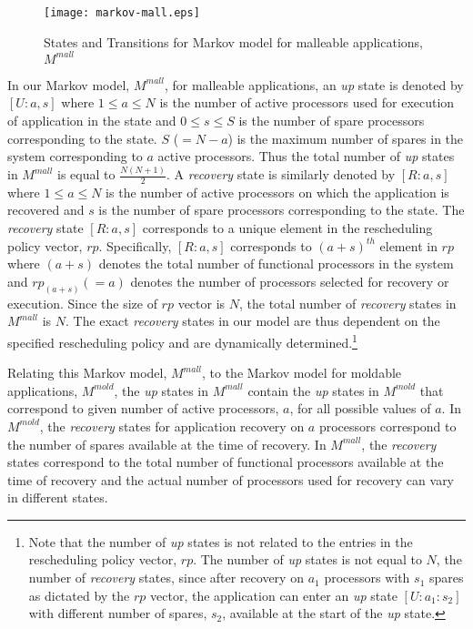 \documentclass[conference,10pt]{IEEEtran}
\begin{document}
\begin{figure}
\centering
\texttt{[image: markov-mall.eps]}
\caption{States and Transitions for Markov model for malleable
  applications, $M^{mall}$}
\label{markov-mall}
\end{figure}

In our Markov model, $M^{mall}$, for malleable applications, an {\em up}
state is denoted by $[U:a,s]$ where $1\leq a\leq N$ is the number of
active processors used for execution of application in the state and
$0\leq s \leq S$ is the number of spare processors corresponding to
the state. $S$ ($=N-a$) is the maximum number of spares in the system
corresponding to $a$ active processors. Thus the total number of {\em up}
states in $M^{mall}$ is equal to $\frac{N(N+1)}{2}$. A {\em recovery} state
is similarly denoted by $[R:a,s]$ where $1\leq a\leq N$ is the number
of active processors on which the application is recovered and $s$ is
the number of spare processors corresponding to the state. The
{\em recovery} state $[R:a,s]$ corresponds to a unique element in the
rescheduling policy vector, $rp$. Specifically, $[R:a,s]$ corresponds
to $(a+s)^{th}$ element in $rp$ where $(a+s)$ denotes the total number
of functional processors in the system and $rp_{(a+s)}(=a)$ denotes the
number of processors selected for recovery or execution. Since the
size of $rp$ vector is $N$, the total number of {\em recovery} states in
$M^{mall}$ is $N$. The exact {\em recovery} states in our model are thus
dependent on the specified rescheduling policy and are dynamically
determined.\footnote{Note that the number of {\em up} states is not related to
  the entries in the rescheduling policy vector, $rp$. The number of
  {\em up} states is not equal to $N$, the number of {\em recovery} states, since
  after recovery on $a_1$ processors with $s_1$ spares as dictated by
  the $rp$ vector, the application can enter an {\em up} state $[U:a_1:s_2]$
  with different number of spares, $s_2$, available at the start of
  the {\em up} state.}

Relating this Markov model, $M^{mall}$, to the Markov model for
moldable applications, $M^{mold}$, the {\em up} states in $M^{mall}$ contain
the {\em up} states in $M^{mold}$ that correspond to given number of active
processors, $a$, for all possible values of $a$. In $M^{mold}$, the
{\em recovery} states for application recovery on $a$
processors correspond to the number of spares available at the time of
recovery. In $M^{mall}$, the {\em recovery} states correspond to the total
number of functional processors available at the time of
recovery and the actual number of processors used
for recovery can vary in different states.
\end{document}
